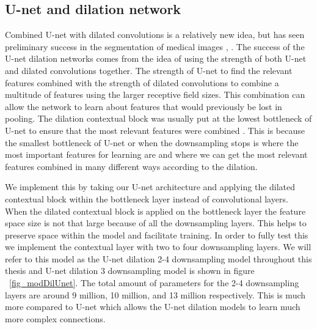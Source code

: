 \subsection{U-net and dilation network}
Combined U-net with dilated convolutions is a relatively new idea, but has seen preliminary success in the segmentation of medical images \cite{10.1007/978-3-030-01449-0_16dilatedunet}, \cite{DBLP:journals/corr/abs-1805-10720}. 
The success of the U-net dilation networks comes from the idea of using the strength of both U-net and dilated convolutions together. 
The strength of U-net to find the relevant features combined with the strength of dilated convolutions to combine a multitude of features using the larger receptive field sizes. 
This combination can allow the network to learn about features that would previously be lost in pooling. 
The dilation contextual block was usually put at the lowest bottleneck of U-net to ensure that the most relevant features were combined \cite{10.1007/978-3-030-01449-0_16dilatedunet}. 
This is because the smallest bottleneck of U-net or when the downsampling stops is where the most important features for learning are and where we can get the most relevant features combined in many different ways according to the dilation. 
    
We implement this by taking our U-net architecture and applying the dilated contextual block within the bottleneck layer instead of convolutional layers. 
When the dilated contextual block is applied on the bottleneck layer the feature space size is not that large because of all the downsampling layers. 
This helps to preserve space within the model and facilitate training.
In order to fully test this we implement the contextual layer with two to four downsampling layers.
We will refer to this model as the U-net dilation 2-4 downsampling model throughout this thesis and U-net dilation 3 downsampling model is shown in figure ~\ref{fig_modDilUnet}.
The total amount of parameters for the 2-4 downsampling layers are around 9 million, 10 million, and 13 million respectively. 
This is much more compared to U-net which allows the U-net dilation models to learn much more complex connections. 
    
